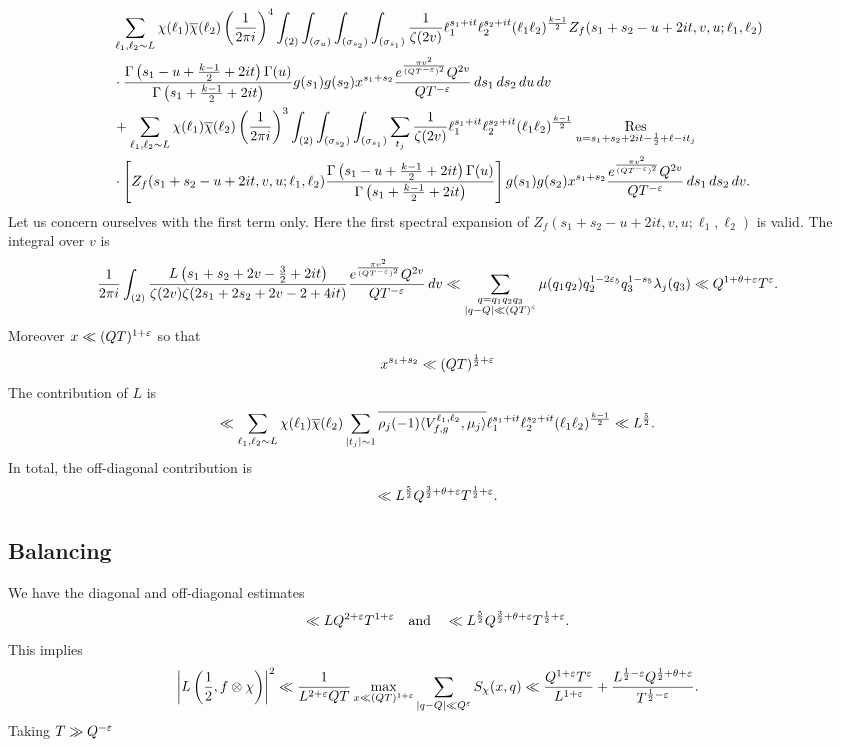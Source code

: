 \documentclass[12pt,reqno,oneside]{amsart}
\begin{document}
    \begin{align*}
      &\sum_{\ell_{1},\ell_{2} \sim L}\chi(\ell_{1})\overline{\chi}(\ell_{2})\left(\frac{1}{2\pi i}\right)^{4}\int_{(2)}\int_{(\sigma_{u})}\int_{(\sigma_{s_{2}})}\int_{(\sigma_{s_{1}})}\frac{1}{\zeta(2v)}\ell_{1}^{s_{1}+it}\ell_{2}^{s_{2}+it}(\ell_{1}\ell_{2})^{\frac{k-1}{2}}Z_{f}(s_{1}+s_{2}-u+2it,v,u;\ell_{1},\ell_{2}) \\
      &\cdot \frac{\Gamma\left(s_{1}-u+\frac{k-1}{2}+2it\right)\Gamma(u)}{\Gamma\left(s_{1}+\frac{k-1}{2}+2it\right)}g(s_{1})g(s_{2})x^{s_{1}+s_{2}}\frac{e^{\frac{\pi v^{2}}{(QT^{-\varepsilon})^{2}}}Q^{2v}}{QT^{-\varepsilon}}\,ds_{1}\,ds_{2}\,du\,dv \\
      &+ \sum_{\ell_{1},\ell_{2} \sim L}\chi(\ell_{1})\overline{\chi}(\ell_{2})\left(\frac{1}{2\pi i}\right)^{3}\int_{(2)}\int_{(\sigma_{s_{2}})}\int_{(\sigma_{s_{1}})}\sum_{t_{j}}\frac{1}{\zeta(2v)}\ell_{1}^{s_{1}+it}\ell_{2}^{s_{2}+it}(\ell_{1}\ell_{2})^{\frac{k-1}{2}}\operatorname*{\mathrm{Res}}_{u = s_{1}+s_{2}+2it-\frac{1}{2}+\ell-it_{j}} \\
      &\cdot \left[Z_{f}(s_{1}+s_{2}-u+2it,v,u;\ell_{1},\ell_{2})\frac{\Gamma\left(s_{1}-u+\frac{k-1}{2}+2it\right)\Gamma(u)}{\Gamma\left(s_{1}+\frac{k-1}{2}+2it\right)}\right]g(s_{1})g(s_{2})x^{s_{1}+s_{2}}\frac{e^{\frac{\pi v^{2}}{(QT^{-\varepsilon})^{2}}}Q^{2v}}{QT^{-\varepsilon}}\,ds_{1}\,ds_{2}\,dv.
    \end{align*}
    Let us concern ourselves with the first term only. Here the first spectral expansion of $Z_{f}(s_{1}+s_{2}-u+2it,v,u;\ell_{1},\ell_{2})$ is valid. The integral over $v$ is
    \[
      \frac{1}{2\pi i}\int_{(2)}\frac{L\left(s_{1}+s_{2}+2v-\frac{3}{2}+2it\right)}{\zeta(2v)\zeta(2s_{1}+2s_{2}+2v-2+4it)}\frac{e^{\frac{\pi v^{2}}{(QT^{-\varepsilon})^{2}}}Q^{2v}}{QT^{-\varepsilon}}\,dv \ll \sum_{\substack{q = q_{1}q_{2}q_{3} \\ |q-Q| \ll (QT)^{\varepsilon}}}\mu(q_{1}q_{2})q_{2}^{1-2\varepsilon_{5}}q_{3}^{1-s_{5}}\lambda_{j}(q_{3}) \ll Q^{1+\theta+\varepsilon}T^{\varepsilon}.
    \]
    Moreover $x \ll (QT)^{1+\varepsilon}$ so that
    \[
      x^{s_{1}+s_{2}} \ll (QT)^{\frac{1}{2}+\varepsilon}
    \]
    The contribution of $L$ is
    \[
      \ll \sum_{\ell_{1},\ell_{2} \sim L}\chi(\ell_{1})\overline{\chi}(\ell_{2})\sum_{|t_{j}| \sim 1}\overline{\rho_{j}(-1)\langle V_{f,g}^{\ell_{1},\ell_{2}},\mu_{j}\rangle}\ell_{1}^{s_{1}+it}\ell_{2}^{s_{2}+it}(\ell_{1}\ell_{2})^{\frac{k-1}{2}} \ll L^{\frac{5}{2}}.
    \]
    In total, the off-diagonal contribution is
    \[
      \ll L^{\frac{5}{2}}Q^{\frac{3}{2}+\theta+\varepsilon}T^{\frac{1}{2}+\varepsilon}.
    \]
  \subsection*{Balancing}
    We have the diagonal and off-diagonal estimates
    \[
      \ll LQ^{2+\varepsilon}T^{1+\varepsilon} \quad \text{and} \quad \ll L^{\frac{5}{2}}Q^{\frac{3}{2}+\theta+\varepsilon}T^{\frac{1}{2}+\varepsilon}.
    \]
    This implies
    \[
      \left|L\left(\frac{1}{2},f \otimes \chi \right)\right|^{2} \ll \frac{1}{L^{2+\varepsilon}QT}\max_{x \ll (QT)^{1+\varepsilon}}\sum_{|q-Q| \ll Q^{\varepsilon}}S_{\chi}(x,q) \ll \frac{Q^{1+\varepsilon}T^{\varepsilon}}{L^{1+\varepsilon}}+\frac{L^{\frac{1}{2}-\varepsilon}Q^{\frac{1}{2}+\theta+\varepsilon}}{T^{\frac{1}{2}-\varepsilon}}.
    \]
    Taking $T \gg Q^{-\varepsilon}$ 
 
\end{document}
